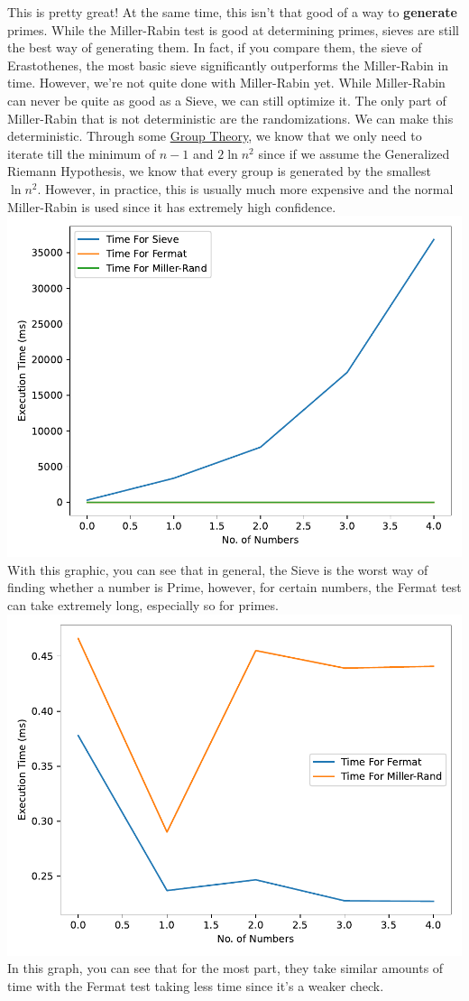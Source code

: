 \documentclass[conference]{IEEEtran}
\begin{document}
This is pretty great! At the same time, this isn't that good of a way to \textbf{generate} primes. While the Miller-Rabin test is good at determining primes, sieves are still the best way of generating them. In fact, if you compare them, the sieve of Erastothenes, the most basic sieve significantly outperforms the Miller-Rabin in time. However, we're not quite done with Miller-Rabin yet. While Miller-Rabin can never be quite as good as a Sieve, we can still optimize it. The only part of Miller-Rabin that is not deterministic are the randomizations. We can make this deterministic. Through some \href{https://doi.org/10.1145%2F800116.803773}{Group Theory}, we know that we only need to iterate till the minimum of $n - 1$ and $2\ln{n}^2$ since if we assume the Generalized Riemann Hypothesis, we know that every group is generated by the smallest $\ln{n}^2$. However, in practice, this is usually much more expensive and the normal Miller-Rabin is used since it has extremely high confidence.
\includegraphics[scale = 0.31]{Fermat-Sieve-MillerRand.pdf}
With this graphic, you can see that in general, the Sieve is the worst way of finding whether a number is Prime, however, for certain numbers, the Fermat test can take extremely long, especially so for primes.
\includegraphics[scale=0.31]{Fermat-MillerRand.pdf}
In this graph, you can see that for the most part, they take similar amounts of time with the Fermat test taking less time since it's a weaker check.
\end{document}
